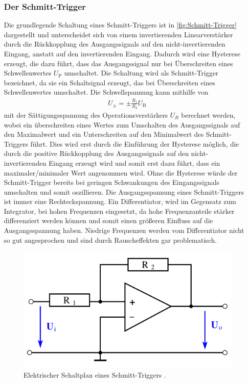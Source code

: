 \subsubsection{Der Schmitt-Trigger}\label{subsubsec:Schmitt-Trigger}    %
Die grundlegende Schaltung eines Schmitt-Triggers ist in \autoref{fig:Schmitt-Trigger} dargestellt und unterscheidet sich von einem invertierenden Linearverstärker durch die Rückkopplung des Ausgangssignals auf den nicht-invertierenden Eingang, anstatt auf den invertierenden Eingang.
Dadurch wird eine Hysterese erzeugt, die dazu führt, dass das Ausgangssignal nur bei Überschreiten eines Schwellenwertes $U_\text{P}$ umschaltet.
Die Schaltung wird als Schmitt-Trigger bezeichnet, da sie ein Schaltsignal erzeugt, das bei Überschreiten eines Schwellenwertes umschaltet.
Die Schwellspannung kann mithilfe von
\begin{align}
    \label{eq:schmitt}
    U_\pm = \pm\frac{R_1}{R_2}U_\text{B}
\end{align}
mit der Sättigungsspannung des Operationsverstärkers $U_B$ berechnet werden, wobei ein überschreiten eines Wertes zum Umschalten des Ausgangssignals auf den Maximalwert und ein Unterschreiten auf den Minimalwert des Schmitt-Triggers führt.
Dies wird erst durch die Einführung der Hysterese möglich, die durch die positive Rückkopplung des Ausgangssignals auf den nicht-invertierenden Eingang erzeugt wird und somit erst dazu führt, dass ein maximaler/minimaler Wert angenommen wird.
Ohne die Hysterese würde der Schmitt-Trigger bereits bei geringen Schwankungen des Eingangssignals umschalten und somit oszillieren.
Die Ausgangsspannung eines Schmitt-Triggers ist immer eine Rechteckspannung.
Ein Differentiator, wird im Gegensatz zum Integrator, bei hohen Frequenzen eingesetzt, da hohe Frequenzanteile stärker differenziert werden können und somit einen größeren Einfluss auf die Ausgangsspannung haben.
Niedrige Frequenzen werden vom Differentiator nicht so gut angesprochen und sind durch Rauscheffekten gar problematisch.
\begin{figure}[H]
	\centering
    \includegraphics[width=0.6\linewidth]{figures/Schmitt-Trigger.png}
	\caption{Elektrischer Schaltplan eines Schmitt-Triggers \cite{Anleitung51}.}
	\label{fig:Schmitt-Trigger}
\end{figure}


